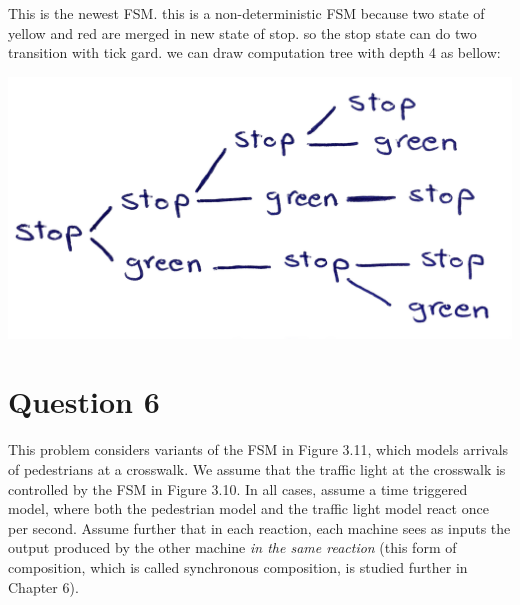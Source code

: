 \documentclass[12pt]{article}
\begin{document}
\begin{enumerate}
\begin{qsolve}[Solution]
		\raggedright This is the newest FSM. this is a non-deterministic FSM because two state of yellow and red are merged in new state of stop. so the stop state can do two transition with tick gard.
		\newline
		we can draw computation tree with depth 4 as bellow:
		
		\centering\includegraphics*[width=0.6\linewidth]{images/img9}
		
	\end{qsolve}
\end{enumerate}

	

	

\vfil
\clearpage


















\section{Question 6}
\raggedright This problem considers variants of the FSM in Figure 3.11, which models arrivals of pedestrians at a crosswalk. We assume that the traffic light at the crosswalk is controlled by the FSM in Figure 3.10. In all cases, assume a time triggered model, where both the pedestrian model and the traffic light model react once per second. Assume further that in each reaction, each machine sees as inputs the output produced by the other machine \textit{in the same reaction} (this form of composition, which is called synchronous composition, is studied further in Chapter 6).
\end{document}

